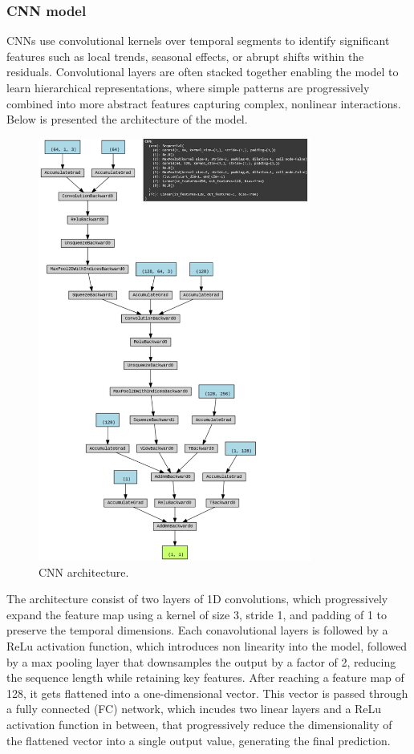 \subsubsection{CNN model}

CNNs use convolutional kernels over temporal segments to identify significant features such as local trends, seasonal effects, or abrupt shifts within the residuals. Convolutional layers are often stacked together enabling the model to learn hierarchical representations, where simple patterns are progressively combined into more abstract features capturing complex, nonlinear interactions. Below is presented the architecture of the model.
 \begin{figure}[H]
    \centering
    \includegraphics[width=0.8\textwidth]{Machine_learning_thesis/Images/CNN architecture.png}
    \caption{CNN architecture.} 
    \label{fig:CNN architecture}
\end{figure}
The architecture consist of two layers of 1D convolutions, which progressively expand the feature map using a kernel of size 3, stride 1, and padding of 1 to preserve the temporal dimensions. Each conavolutional layers is followed by a ReLu activation function, which introduces non linearity into the model, followed by a max pooling layer that downsamples the output by a factor of 2, reducing the sequence length while retaining key features. After reaching a feature map of 128, it gets flattened into a one-dimensional vector. This vector is passed through a fully connected (FC) network, which incudes two linear layers and a ReLu activation function in between, that progressively reduce the dimensionality of the flattened vector into a single output value, generating the final prediction. 

